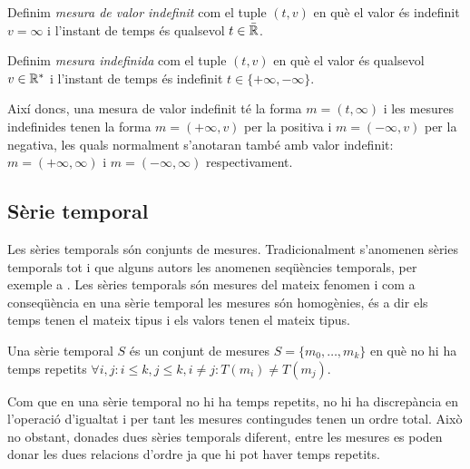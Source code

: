 \begin{definition}
  \label{def:model:mesura_valor_indefinit}
  Definim \emph{mesura de valor indefinit} com el tuple $(t,v)$ en
  què el valor és indefinit $v=\infty$ i l'instant de temps és
  qualsevol $t\in\bar{\mathbb{R}{}}$.
\end{definition}

\begin{definition}
  \label{def:model:mesura_indefinida}
  Definim \emph{mesura indefinida} com el tuple $(t,v)$ en què el
  valor és qualsevol $v\in\mathbb{R}{}^*$ i l'instant de temps és indefinit
  $t\in\{+\infty,-\infty\}$.
\end{definition}

Així doncs, una mesura de valor indefinit té la forma $m=(t,\infty)$
i les mesures indefinides tenen la forma $m=(+\infty,v)$ per la
positiva i $m=(-\infty,v)$ per la negativa, les quals normalment
s'anotaran també amb valor indefinit: $m=(+\infty,\infty)$ i
$m=(-\infty,\infty)$ respectivament.








\subsection{Sèrie temporal}
\label{sec:model:serietemporal}

Les sèries temporals són conjunts de mesures.
Tradicionalment s'anomenen sèries temporals tot i que alguns autors
les anomenen seqüències temporals, per exemple a \cite{last:hetland}.
Les sèries temporals són mesures del mateix fenomen i com a
conseqüència en una sèrie temporal les mesures són homogènies, és a
dir els temps tenen el mateix tipus i els valors tenen el mateix
tipus. 


\begin{definition}
  \label{def:serie_temporal}
  Una sèrie temporal $S$ és un conjunt de mesures
  $S=\{m_0,\ldots,m_k\}$ en què no hi ha temps repetits
  $\forall i,j: i\leq k, j\leq k, i\neq j : T(m_i)\neq T(m_j)$.
\end{definition}


Com que en una sèrie temporal no hi ha temps repetits, no hi ha
discrepància en l'operació d'igualtat i per tant les mesures
contingudes tenen un ordre total. Això no obstant, donades dues sèries
temporals diferent, entre les mesures es poden donar les dues
relacions d'ordre ja que hi pot haver temps repetits.



